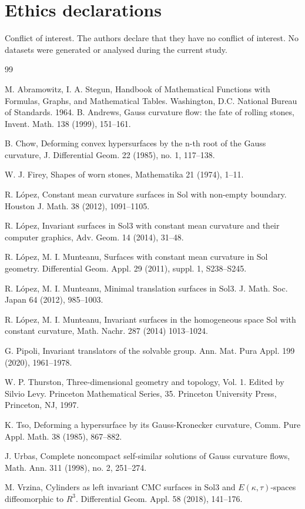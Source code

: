 \documentclass[a4paper,12pt]{amsart}
\theoremstyle{plain}
\theoremstyle{definition}
\begin{document}
\section*{Ethics declarations}

Conflict of interest. The authors declare that they have no conflict of interest. No datasets were generated or analysed during the current study.


\begin{thebibliography}{99}
 
  M. Abramowitz, I. A. Stegun, Handbook of Mathematical Functions with Formulas, Graphs, and Mathematical Tables. Washington, D.C. National Bureau of Standards. 1964. 
B. Andrews, Gauss curvature flow: the fate of rolling stones, Invent. Math. 138 (1999), 151--161.



 
B. Chow, Deforming convex hypersurfaces by the n-th root of the Gauss curvature, J. Differential Geom. 22 (1985), no. 1, 117--138.
 
W. J. Firey, Shapes of worn stones, Mathematika 21 (1974), 1--11.

 R. L\'opez, Constant mean curvature surfaces in Sol with non-empty boundary. 
Houston J. Math. 38 (2012), 1091--1105.

 R. L\'opez, Invariant surfaces in Sol3 with constant mean curvature and their computer graphics, Adv. Geom. 14 (2014), 31--48.

 R. L\'opez, M. I. Munteanu, Surfaces with constant mean curvature in Sol geometry. Differential Geom. Appl. 29 (2011), suppl. 1, S238--S245.

R. L\'opez, M. I. Munteanu, Minimal translation surfaces in Sol3. 
J. Math. Soc. Japan 64 (2012), 985--1003.


 R. L\'opez, M. I. Munteanu, Invariant surfaces in the homogeneous space Sol with constant curvature, Math. Nachr. 287 (2014) 1013--1024. 



  G. Pipoli, 
Invariant translators of the solvable group. Ann. Mat. Pura Appl. 199 (2020), 1961--1978.

W. P. Thurston, Three-dimensional geometry and topology, Vol. 1. Edited by Silvio Levy. Princeton Mathematical Series, 35. Princeton University Press, Princeton, NJ, 1997.

K. Tso, Deforming a hypersurface by its Gauss-Kronecker curvature, 
Comm. Pure Appl. Math. 38 (1985), 867--882.


J. Urbas, Complete noncompact self-similar solutions of Gauss curvature flows, Math. Ann. 311 (1998), no. 2, 251--274.

  M. Vrzina, Cylinders as left invariant CMC surfaces in Sol3 and $E(\kappa,\tau)$-spaces diffeomorphic to $R^3$.
Differential Geom. Appl. 58 (2018), 141--176.
\end{thebibliography}
\end{document}
